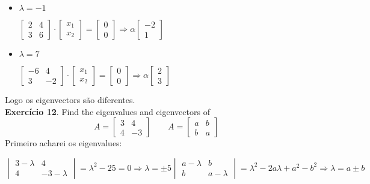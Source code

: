 \documentclass[12pt]{article}
\begin{document}
\begin{itemize}
\item $\lambda = -1$
  \begin{center}
    $
    \begin{bmatrix}
      2 & 4 \\
      3 & 6 
    \end{bmatrix}\cdot
    \begin{bmatrix}
      x_1 \\ x_2
    \end{bmatrix} =
    \begin{bmatrix}
      0 \\ 0
    \end{bmatrix}\Rightarrow
    \alpha
    \begin{bmatrix}
      -2 \\ 1
    \end{bmatrix}
    $
  \end{center}
\item $\lambda = 7$
  \begin{center}
    $
    \begin{bmatrix}
      -6 & 4 \\
      3 & -2
    \end{bmatrix}\cdot
    \begin{bmatrix}
      x_1 \\ x_2
    \end{bmatrix}=
    \begin{bmatrix}
      0 \\ 0
    \end{bmatrix}\Rightarrow \alpha
    \begin{bmatrix}
      2 \\ 3
    \end{bmatrix}
    $
  \end{center}
\end{itemize}
Logo os eigenvectors são diferentes.\\
\newpage
\textbf{Exercício 12}.
Find the eigenvalues and eigenvectors of 
$$A = \left[\begin{matrix}
    3 & 4 \\
    4 & -3
  \end{matrix}\right]\quad \quad 
A = \left[\begin{matrix}
    a & b \\
    b & a
  \end{matrix}\right]
$$
Primeiro acharei os eigenvalues:\\
\begin{center}
  $\begin{vmatrix}
    3-\lambda & 4 \\
    4 & -3-\lambda
  \end{vmatrix}=\lambda^2-25=0\Rightarrow\lambda=\pm 5
  \begin{vmatrix}
    a-\lambda & b \\
    b & a-\lambda
  \end{vmatrix}=\lambda^2-2a\lambda+a^2-b^2\Rightarrow \lambda=a\pm b
  $
\end{center}
\end{document}
